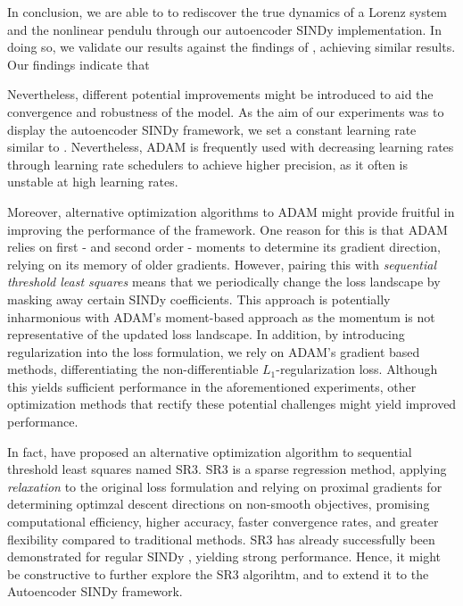 In conclusion, we are able to to rediscover the true dynamics of a Lorenz system and the nonlinear pendulu through our autoencoder SINDy implementation. 
In doing so, we validate our results against the findings of \textcite{Champion_2019}, achieving similar results. 
Our findings indicate that 

Nevertheless, different potential improvements might be introduced to aid the convergence and robustness of the model. 
As the aim of our experiments was to display the autoencoder SINDy framework, we set a constant learning rate similar to \textcite{Champion_2019}. 
Nevertheless, \textsc{ADAM} is frequently used with decreasing learning rates through learning rate schedulers to achieve higher precision, as it often is unstable at high learning rates. 

Moreover, alternative optimization algorithms to \textsc{ADAM} might provide fruitful in improving the performance of the framework. 
One reason for this is that \textsc{ADAM} relies on first - and second order - moments to determine its gradient direction, relying on its memory of older gradients. 
However, pairing this with \textit{sequential threshold least squares} means that we periodically change the loss landscape by masking away certain SINDy coefficients. 
This approach is potentially inharmonious with \textsc{ADAM}'s moment-based approach as the momentum is not representative of the updated loss landscape. 
In addition, by introducing regularization into the loss formulation, we rely on \textsc{ADAM}'s gradient based methods, differentiating the non-differentiable $L_1$-regularization loss.
Although this yields sufficient performance in the aforementioned experiments, other optimization methods that rectify these potential challenges might yield improved performance. 

In fact, \textcite{SR3} have proposed an alternative optimization algorithm to sequential threshold least squares named SR3. 
SR3 is a sparse regression method, applying \textit{relaxation} to the original loss formulation and relying on proximal gradients for determining optimzal descent directions on non-smooth objectives, promising computational efficiency, higher accuracy, faster convergence rates, and greater flexibility compared to traditional methods. 
SR3 has already successfully been demonstrated for regular SINDy \cite{SR3_SINDy}, yielding strong performance. 
Hence, it might be constructive to further explore the SR3 algorihtm, and to extend it to the Autoencoder SINDy framework. 

